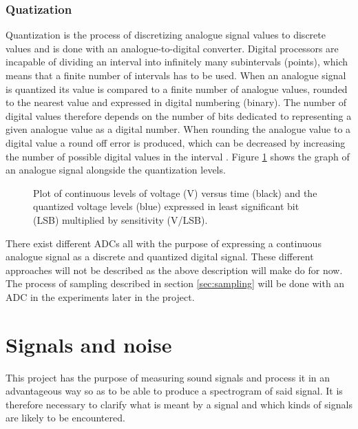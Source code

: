 \subsubsection{Quatization}
Quantization is the process of discretizing analogue signal values to discrete values and is done with an analogue-to-digital converter. Digital processors are incapable of dividing an interval into infinitely many subintervals (points), which means that a finite number of intervals has to be used. When an analogue signal is quantized its value is compared to a finite number of analogue values, rounded to the nearest value and expressed in digital numbering (binary). The number of digital values therefore depends on the number of bits dedicated to representing a given analogue value as a digital number. When rounding the analogue value to a digital value a round off error is produced, which can be decreased by increasing the number of possible digital values in the interval \cite{pelgrom}. Figure \ref{fig:quant} shows the graph of an analogue signal alongside the quantization levels.
\begin{figure}[H]
\centering
{}
\caption{Plot of continuous levels of voltage (V) versus time (black) and the quantized voltage levels (blue) expressed in least significant bit (LSB) multiplied by sensitivity (V/LSB).}
\label{fig:quant}
\end{figure}

There exist different ADCs \cite{pelgrom} all with the purpose of expressing a continuous analogue signal as a discrete and quantized digital signal. These different approaches will  not be described as the above description will make do for now. The process of sampling described in section \ref{sec:sampling} will be done with an ADC in the experiments later in the project.

\clearpage
\section{Signals and noise}
This project has the purpose of measuring sound signals and process it in an advantageous way so as to be able to produce a spectrogram of said signal. It is therefore necessary to clarify what is meant by a signal and which kinds of signals are likely to be encountered.

